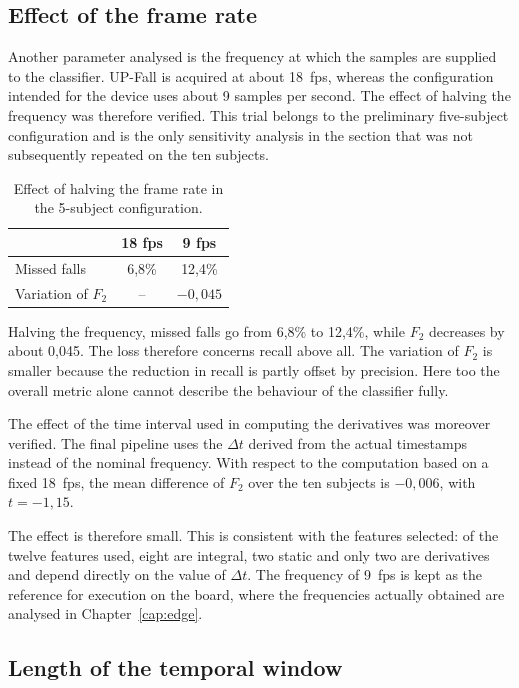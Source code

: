 \subsection{Effect of the frame rate}
\label{sec:framerate}

Another parameter analysed is the frequency at which the samples are
supplied to the classifier. UP-Fall is acquired at about 18~fps, whereas the
configuration intended for the device uses about 9 samples per second.
The effect of halving the frequency was therefore verified. This trial belongs to the preliminary five-subject configuration and is the only sensitivity analysis in the section that was not subsequently repeated on the ten subjects.

\begin{table}[ht]
\centering
\caption{Effect of halving the frame rate in the 5-subject configuration.}
\label{tab:framerate}
\begin{tabular}{lcc}
\toprule
 & \textbf{18 fps} & \textbf{9 fps} \\
\midrule
Missed falls & 6,8\% & 12,4\% \\
Variation of $F_2$ & -- & $-0{,}045$ \\
\bottomrule
\end{tabular}
\end{table}

Halving the frequency, missed falls go from 6,8\% to 12,4\%, while $F_2$ decreases by about 0,045. The loss therefore concerns recall above all. The variation of $F_2$ is smaller because the reduction in recall is partly offset by precision. Here too the overall metric alone cannot describe the behaviour of the classifier fully.

The effect of the time interval used in computing the derivatives was moreover verified. The final pipeline uses the $\Delta t$ derived from the actual timestamps instead of the nominal frequency. With respect to the computation based on a fixed 18~fps, the mean difference of $F_2$ over the ten subjects is $-0{,}006$, with $t=-1{,}15$.

The effect is therefore small. This is consistent with the features selected: of the twelve features used, eight are integral, two static and only two are derivatives and depend directly on the value of $\Delta t$. The frequency of 9~fps is kept as the reference for execution on the board, where the frequencies actually obtained are analysed in Chapter~\ref{cap:edge}.

\subsection{Length of the temporal window}
\label{sec:lunghezza_finestra}

